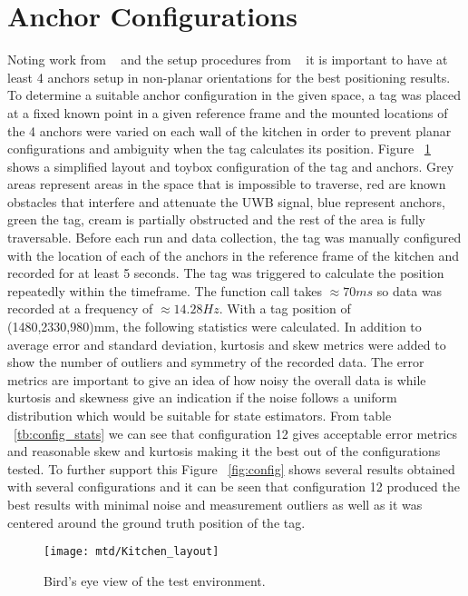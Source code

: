 \section{Anchor Configurations}\label{sec:anchor-configurations}
Noting work from ~\citet{di2019evaluation} and the setup procedures from ~\citet{pozyx2018pozyx} it is important to have at least 4 anchors setup in non-planar orientations for the best positioning results.
To determine a suitable anchor configuration in the given space, a tag was placed at a fixed known point in a given reference frame and the mounted locations of the 4 anchors were varied on each wall of the kitchen in order to prevent planar configurations and ambiguity when the tag calculates its position.
Figure ~\ref{fig:layout} shows a simplified layout and toybox configuration of the tag and anchors.
Grey areas represent areas in the space that is impossible to traverse, red are known obstacles that interfere and attenuate the UWB signal, blue represent anchors, green the tag, cream is partially obstructed and the rest of the area is fully traversable.
Before each run and data collection, the tag was manually configured with the location of each of the anchors in the reference frame of the kitchen and recorded for at least 5 seconds.
The tag was triggered to calculate the position repeatedly within the timeframe.
The function call takes $\approx70ms$ so data was recorded at a frequency of $\approx14.28Hz$.
With a tag position of (1480,2330,980)mm, the following statistics were calculated.
In addition to average error and standard deviation,  kurtosis and skew metrics were added to show the number of outliers and symmetry of the recorded data.
The error metrics are important to give an idea of how noisy the overall data is while kurtosis and skewness give an indication if the noise follows a uniform distribution which would be suitable for state estimators.
From table ~\ref{tb:config_stats} we can see that configuration 12 gives acceptable error metrics and reasonable skew and kurtosis making it the best out of the configurations tested.
To further support this Figure ~\ref{fig:config} shows several results obtained with several configurations and it can be seen that configuration 12 produced the best results with minimal noise and measurement outliers as well as it was centered around the ground truth position of the tag.

\begin{figure}[h!]
    \centering
    \texttt{[image: mtd/Kitchen\_layout]}
    \caption{Bird's eye view of the test environment.}
    \label{fig:layout}
\end{figure}
\newpage

